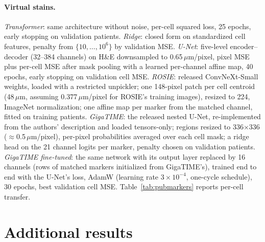 \documentclass[10pt,letterpaper]{article}
\theoremstyle{definition}
\theoremstyle{remark}
\newcommand{\method}{\textnormal{\textsc{Ligature}}}
\begin{document}
\paragraph{Virtual stains.} \emph{Transformer}: same architecture without noise, per-cell squared loss, 25 epochs, early stopping on validation patients. \emph{Ridge}: closed form on standardized cell features, penalty from $\{10,\dots,10^6\}$ by validation MSE. \emph{U-Net}: five-level encoder--decoder (32--384 channels) on H\&E downsampled to 0.65\,$\mu$m/pixel, pixel MSE plus per-cell MSE after mask pooling with a learned per-channel affine map, 40 epochs, early stopping on validation cell MSE. \emph{ROSIE}: released ConvNeXt-Small weights, loaded with a restricted unpickler; one 148-pixel patch per cell centroid (48\,$\mu$m, assuming 0.377\,$\mu$m/pixel for ROSIE's training images), resized to 224, ImageNet normalization; one affine map per marker from the matched channel, fitted on training patients. \emph{GigaTIME}: the released nested U-Net, re-implemented from the authors' description and loaded tensors-only; regions resized to 336$\times$336 ($\approx$0.5\,$\mu$m/pixel), per-pixel probabilities averaged over each cell mask; a ridge head on the 21 channel logits per marker, penalty chosen on validation patients. \emph{GigaTIME fine-tuned}: the same network with its output layer replaced by 16 channels (rows of matched markers initialized from GigaTIME's), trained end to end with the U-Net's loss, AdamW (learning rate $3\times10^{-4}$, one-cycle schedule), 30 epochs, best validation cell MSE. Table~\ref{tab:pubmarkers} reports per-cell transfer.

\begin{table}[htp]
\centering
\caption{Per-cell Pearson correlation between published-model predictions and measured ORION intensities on test patients (mean over rotations). GigaTIME is shown for markers with a matched channel.}
\label{tab:pubmarkers}
\normalsize

\end{table}

\section{Additional results}

\begin{table}[t]
\centering
\caption{\method{} wrapped around six virtual stains (40 held-out patients). Cell MSE: per-cell test MSE of the stain. Bias: median relative bias of cohort means. MSE: patient-level MSE relative to the stain's own plug-in for all statistics and the 16 clustering statistics. CRPS: ratio to a calibrated Gaussian plug-in. Contact: patient-level MSE of gated contact fractions relative to the plug-in, for the quantile-matched plug-in and \method{}. $^\dagger$GigaTIME: bias, MSE and CRPS columns use the 45 statistics among the 9 markers it measures directly; contact uses all pairs, with other markers predicted by its linear head.}
\label{tab:stains}
\setlength{\tabcolsep}{3pt}

\end{table}
\end{document}
